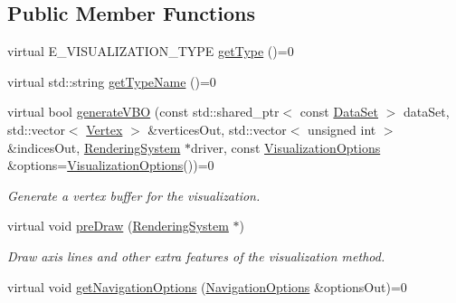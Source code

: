 \subsection*{Public Member Functions}
\begin{DoxyCompactItemize}
\item 
virtual E\+\_\+\+V\+I\+S\+U\+A\+L\+I\+Z\+A\+T\+I\+O\+N\+\_\+\+T\+Y\+PE \hyperlink{class_lots_of_lines_1_1_i_visualization_method_a79b6c5d987437bcc7204c4e63aba7c31}{get\+Type} ()=0
\item 
virtual std\+::string \hyperlink{class_lots_of_lines_1_1_i_visualization_method_adbf8ab4dff252bbc3491e4acbebd0d28}{get\+Type\+Name} ()=0
\item 
virtual bool \hyperlink{class_lots_of_lines_1_1_i_visualization_method_ac31b5ad80f94fdfcf424a75b6afe27ea}{generate\+V\+BO} (const std\+::shared\+\_\+ptr$<$ const \hyperlink{class_lots_of_lines_1_1_data_set}{Data\+Set} $>$ data\+Set, std\+::vector$<$ \hyperlink{struct_lots_of_lines_1_1_vertex}{Vertex} $>$ \&vertices\+Out, std\+::vector$<$ unsigned int $>$ \&indices\+Out, \hyperlink{class_lots_of_lines_1_1_rendering_system}{Rendering\+System} $\ast$driver, const \hyperlink{class_lots_of_lines_1_1_visualization_options}{Visualization\+Options} \&options=\hyperlink{class_lots_of_lines_1_1_visualization_options}{Visualization\+Options}())=0\hypertarget{class_lots_of_lines_1_1_i_visualization_method_ac31b5ad80f94fdfcf424a75b6afe27ea}{}\label{class_lots_of_lines_1_1_i_visualization_method_ac31b5ad80f94fdfcf424a75b6afe27ea}

\begin{DoxyCompactList}\small\item\em Generate a vertex buffer for the visualization. \end{DoxyCompactList}\item 
virtual void \hyperlink{class_lots_of_lines_1_1_i_visualization_method_ac03a0f363501f36fec7cecdace77db0d}{pre\+Draw} (\hyperlink{class_lots_of_lines_1_1_rendering_system}{Rendering\+System} $\ast$)\hypertarget{class_lots_of_lines_1_1_i_visualization_method_ac03a0f363501f36fec7cecdace77db0d}{}\label{class_lots_of_lines_1_1_i_visualization_method_ac03a0f363501f36fec7cecdace77db0d}

\begin{DoxyCompactList}\small\item\em Draw axis lines and other extra features of the visualization method. \end{DoxyCompactList}\item 
virtual void \hyperlink{class_lots_of_lines_1_1_i_visualization_method_a4e79488141ff0b4ec79dc11c72184b2a}{get\+Navigation\+Options} (\hyperlink{struct_lots_of_lines_1_1_navigation_options}{Navigation\+Options} \&options\+Out)=0\hypertarget{class_lots_of_lines_1_1_i_visualization_method_a4e79488141ff0b4ec79dc11c72184b2a}{}\label{class_lots_of_lines_1_1_i_visualization_method_a4e79488141ff0b4ec79dc11c72184b2a}


\end{DoxyCompactItemize}
